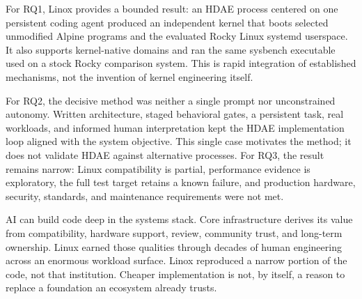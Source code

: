 \documentclass[11pt]{article}
\begin{document}
For RQ1, Linox provides a bounded result: an HDAE process centered on one
persistent coding agent produced an independent kernel that boots selected
unmodified Alpine programs and the evaluated Rocky Linux systemd userspace. It
also supports kernel-native domains and ran
the same sysbench executable used on a stock Rocky comparison system. This is
rapid integration of established mechanisms, not the invention of kernel
engineering itself.

For RQ2, the decisive method was neither a single prompt nor unconstrained
autonomy. Written architecture, staged behavioral gates, a persistent task,
real workloads, and informed human interpretation kept the HDAE implementation loop
aligned with the system objective. This single case motivates the method; it
does not validate HDAE against alternative processes. For RQ3, the result
remains narrow: Linux compatibility is partial, performance evidence is
exploratory, the full test target retains a known failure, and production
hardware, security, standards, and maintenance requirements were not met.

AI can build code deep in the systems stack. Core infrastructure derives its
value from compatibility, hardware support, review, community trust, and
long-term ownership. Linux earned those qualities through decades of human
engineering across an enormous workload surface. Linox reproduced a narrow
portion of the code, not that institution. Cheaper implementation is not, by
itself, a reason to replace a foundation an ecosystem already trusts.

\clearpage
\begingroup
\small
\setlength{\baselineskip}{8.5pt}
\raggedright


\endgroup
\end{document}
